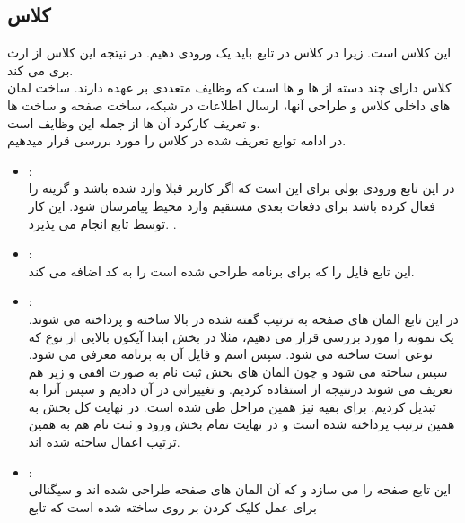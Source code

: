 \documentclass[12pt,onecolumn,a4paper]{article}
\begin{document}
\subsection{کلاس}
این کلاس
 است. زیرا در کلاس
 در تابع
 باید یک
 ورودی دهیم. در نیتجه این کلاس از
 ارث بری می کند. \\
کلاس دارای چند دسته از
ها و
 ها است که وظایف متعددی بر عهده دارند. ساخت لمان های داخلی کلاس و طراحی آنها، ارسال اطلاعات در شبکه، ساخت صفحه
 و ساخت
 ها و تعریف کارکرد آن ها از جمله این وظایف است.\\
در ادامه توابع تعریف شده در کلاس را مورد بررسی قرار میدهیم.\\
\begin{itemize}
\item {} : \\
در این تابع ورودی بولی برای این است که اگر کاربر قبلا وارد شده باشد و گزینه
 را فعال کرده باشد برای دفعات بعدی مستقیم وارد محیط پیامرسان شود. این کار توسط تابع
انجام می پذیرد.
.\\
\item {}:
\\
این تابع فایل
را که برای
برنامه طراحی شده است را به کد اضافه می کند.
\\
\item {}:
\\
 در این تابع المان های صفحه به ترتیب گفته شده در بالا ساخته و پرداخته می شوند.
یک نمونه را مورد بررسی قرار می دهیم، 
مثلا در بخش
 ابتدا آیکون بالایی از نوع
که نوعی
 است ساخته می شود. سپس اسم و فایل آن به برنامه معرفی می شود. 
سپس
 ساخته می شود و چون المان های بخش ثبت نام به صورت افقی و زیر هم تعریف می شوند درنتیجه از
 استفاده کردیم. و تغییراتی در آن دادیم و سپس آنرا به
 تبدیل کردیم.
برای بقیه نیز همین مراحل طی شده است. در نهایت کل بخش
 به همین ترتیب پرداخته شده است و در نهایت تمام بخش ورود و ثبت نام هم به همین ترتیب اعمال ساخته شده اند.\\
\item {}:
\\
 این تابع صفحه
  را می سازد و که آن المان های صفحه طراحی شده اند و سیگنالی برای عمل کلیک کردن بر روی
ساخته شده است که تابع

\end{itemize}
\end{document}
